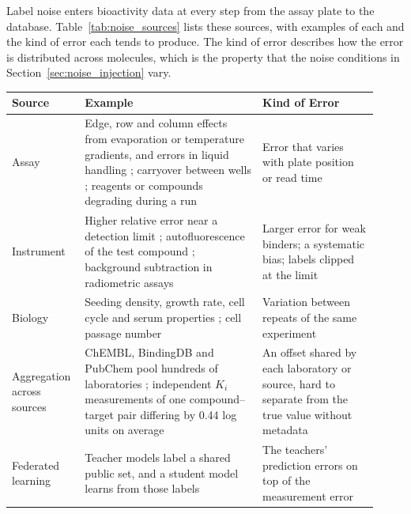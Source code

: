 Label noise enters bioactivity data at every step from the assay plate to the database. Table~\ref{tab:noise_sources} lists these sources, with examples of each and the kind of error each tends to produce. The kind of error describes how the error is distributed across molecules, which is the property that the noise conditions in Section~\ref{sec:noise_injection} vary.
\begin{table}[htbp]
\centering
\small
\begin{adjustbox}{max width=\textwidth,max totalheight=0.78\textheight}
\begin{tabular}{@{}P{0.16\linewidth}P{0.46\linewidth}P{0.30\linewidth}@{}}
\toprule
\textbf{Source} & \textbf{Example} & \textbf{Kind of Error} \\
\midrule
Assay & Edge, row and column effects from evaporation or temperature gradients, and errors in liquid handling \citep{Makarenkov2007}; carryover between wells \citep{Inglese2006}; reagents or compounds degrading during a run \citep{Brideau2003} & Error that varies with plate position or read time \\
Instrument & Higher relative error near a detection limit \citep{Zhang1999}; autofluorescence of the test compound \citep{Simeonov2008}; background subtraction in radiometric assays \citep{Zhang1999} & Larger error for weak binders; a systematic bias; labels clipped at the limit \\
Biology & Seeding density, growth rate, cell cycle and serum properties \citep{Hatzis2014}; cell passage number \citep{Postnikova2018} & Variation between repeats of the same experiment \\
Aggregation across sources & ChEMBL, BindingDB and PubChem pool hundreds of laboratories \citep{Gaulton2017, Gilson2016}; independent $K_i$ measurements of one compound--target pair differing by 0.44 log units on average \citep{Kramer2012} & An offset shared by each laboratory or source, hard to separate from the true value without metadata \citep{Fourches2016} \\
Federated learning & Teacher models label a shared public set, and a student model learns from those labels \citep{Bassani2023} & The teachers' prediction errors on top of the measurement error \\

\end{tabular}
\end{adjustbox}
\end{table}

